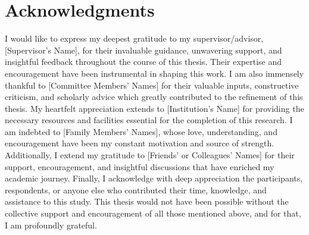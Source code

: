 \chapter{Acknowledgments}

I would like to express my deepest gratitude to my supervisor/advisor, [Supervisor's Name], for their invaluable guidance, unwavering support, and insightful feedback throughout the course of this thesis. Their expertise and encouragement have been instrumental in shaping this work.
I am also immensely thankful to [Committee Members' Names] for their valuable inputs, constructive criticism, and scholarly advice which greatly contributed to the refinement of this thesis.
My heartfelt appreciation extends to [Institution's Name] for providing the necessary resources and facilities essential for the completion of this research.
I am indebted to [Family Members' Names], whose love, understanding, and encouragement have been my constant motivation and source of strength.
Additionally, I extend my gratitude to [Friends' or Colleagues' Names] for their support, encouragement, and insightful discussions that have enriched my academic journey.
Finally, I acknowledge with deep appreciation the participants, respondents, or anyone else who contributed their time, knowledge, and assistance to this study.
This thesis would not have been possible without the collective support and encouragement of all those mentioned above, and for that, I am profoundly grateful.

\cleardoublepage
